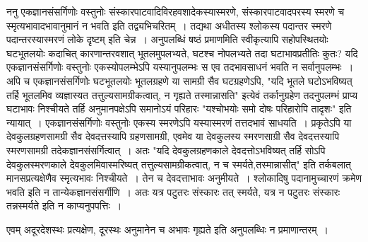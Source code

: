 {ननु एकज्ञानसंसर्गिणोः वस्तुनोः संस्कारपाटवादिविरहवशादेकस्यास्मरणे, संस्कारपाटवादपरस्य स्मरणे च स्मृत्यभावादभावानुमानं न भवति इति तद्व्यभिचरितम्~। तद्यथा अधीतस्य श्लोकस्य पदान्तर स्मरणे पदान्तरस्यास्मरणं लोके दृष्टम् इति चेन्न~। अनुपलब्धिं षष्ठं प्रमाणमिति स्वीकृत्यापि सहोपस्थितयोः घटभूतलयोः कदाचित् कारणान्तरवशात् भूतलमुपलभ्यते, घटश्च नोपलभ्यते तदा घटाभावप्रतीतिः कुतः? यदि एकज्ञानसंसर्गिणोः वस्तुनोः एकस्योपलम्भेऽपि यस्यानुपलम्भः स एव तदभावसाधनं भवति न सर्वानुपलम्भः~। अपि च एकज्ञानसंसर्गिणोः घटभूतलयोः भूतलग्रहणे या सामग्री सैव घटग्रहणेऽपि, "यदि भूतले \-घटोऽभविष्यत् तर्हि भूतलमिव व्यज्ञास्यत तत्तुल्यसामग्रीकत्वात्, न गृह्यते तस्मान्नासति" इत्येवं तर्कानुग्रहेण तदनुपलम्भं प्राप्य घटाभावः निश्चीयते तर्हि अनुमानपक्षेऽपि समानोऽयं परिहारः "यश्चोभयोः समो दोषः परिहारोपि तादृशः" इति न्यायात्~। एकज्ञानसंसर्गिणोः वस्तुनोः एकस्य स्मरणेऽपि यस्यास्मरणं तत्तदभावं साधयति~। प्रकृतेऽपि या देवकुलग्रहणसामग्री सैव देवदत्तस्यापि ग्रहणसामग्री, एवमेव या देवकुलस्य स्मरणसाग्री सैव देवदत्तस्यापि स्मरणसामग्री तदेकज्ञानसंसर्गित्वात्~। अतः "यदि देवकुलग्रहणकाले देवदत्तोऽभविष्यत् \-तर्हि सोऽपि देवकुलस्मरणकाले देवकुलमिवास्मरिष्यत् तत्तुल्यसामग्रीकत्वात्, न च स्मर्यते,\break तस्मान्नासीत्" इति तर्कबलात् मानसप्रत्यक्षेणैव स्मृत्यभावः निश्चीयते~। तेन च देवदत्ताभावः अनुमीयते~। श्लोकादिषु पदानामुच्चारणं क्रमेण भवति इति न तान्येकज्ञानसंसर्गीणि~। अतः यत्र पटुतरः संस्कारः तत् स्मर्यते, यत्र न पटुतरः संस्कारः तन्नस्मर्यते इति न काप्यनुपपत्तिः~। 

एवम् अदूरदेशस्थः प्रत्यक्षेण, दूरस्थः अनुमानेन च अभावः गृह्यते इति अनुपलब्धिः न प्रमाणान्तरम्~। 

\articleend
}
